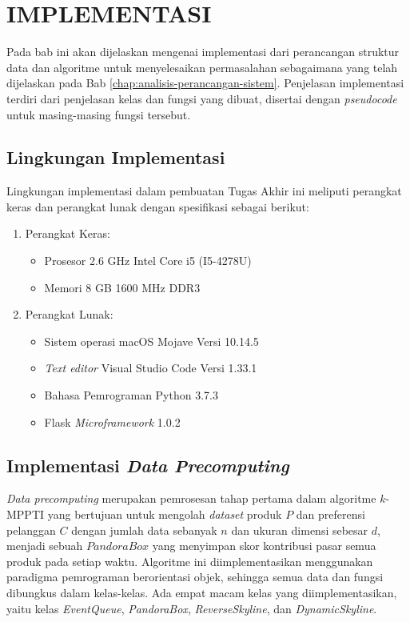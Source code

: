 \chapter{IMPLEMENTASI} \label{chap:implementasi}

\tab Pada bab ini akan dijelaskan mengenai implementasi dari perancangan struktur data dan algoritme untuk menyelesaikan permasalahan \problemDua{} sebagaimana yang telah dijelaskan pada Bab \ref{chap:analisis-perancangan-sistem}. Penjelasan implementasi terdiri dari penjelasan kelas dan fungsi yang dibuat, disertai dengan \textit{pseudocode} untuk masing-masing fungsi tersebut.

\section{Lingkungan Implementasi}
\tab Lingkungan implementasi dalam pembuatan Tugas Akhir ini meliputi perangkat keras dan perangkat lunak dengan spesifikasi sebagai berikut:

\begin{enumerate}
	\item Perangkat Keras:
		\begin{itemize}
			\item Prosesor 2.6 GHz Intel Core i5 (I5-4278U)
			\item Memori 8 GB 1600 MHz DDR3
		\end{itemize}
	\item Perangkat Lunak:
	\begin{itemize}
		\item Sistem operasi macOS Mojave Versi 10.14.5
		\item \textit{Text editor} Visual Studio Code Versi 1.33.1
		\item Bahasa Pemrograman Python 3.7.3
		\item Flask \textit{Microframework} 1.0.2
	\end{itemize}			
\end{enumerate}

\section{Implementasi \textit{Data Precomputing}}
\tab \textit{Data precomputing} merupakan pemrosesan tahap pertama dalam algoritme $k$-MPPTI yang bertujuan untuk mengolah \textit{dataset} produk $P$ dan preferensi pelanggan $C$ dengan jumlah data sebanyak $n$ dan ukuran dimensi sebesar $d$, menjadi sebuah $Pandora Box$ yang menyimpan skor kontribusi pasar semua produk pada setiap waktu. Algoritme ini diimplementasikan menggunakan paradigma pemrograman berorientasi objek, sehingga semua data dan fungsi dibungkus dalam kelas-kelas. Ada empat macam kelas yang diimplementasikan, yaitu kelas \textit{EventQueue}, \textit{PandoraBox}, \textit{ReverseSkyline}, dan \textit{DynamicSkyline}.

